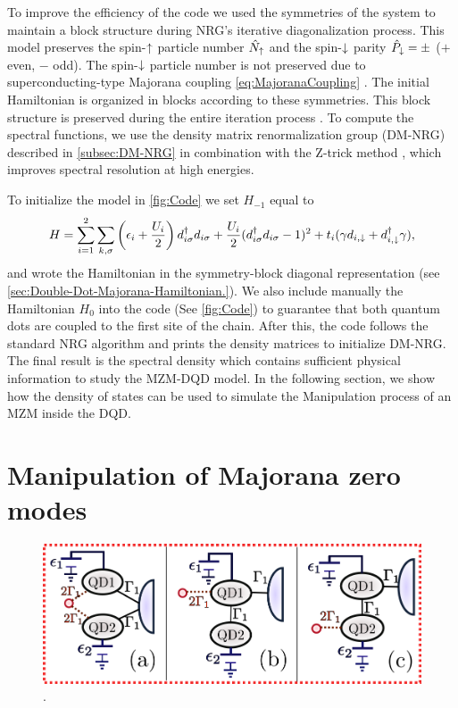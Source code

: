 

To  improve the efficiency of the code we used the symmetries of the system to maintain a block structure during NRG's iterative diagonalization process. This model preserves the spin-$\uparrow$ particle number $\hat{N}_\uparrow$ and the spin-$\downarrow$ parity $\hat{P}_\downarrow = \pm $ ($+$ even, $-$ odd). The spin-$\downarrow$ particle number is not preserved due to superconducting-type Majorana coupling  \eqref{eq:MajoranaCoupling} . The initial Hamiltonian is organized in blocks according to these symmetries. This block structure is preserved during the entire iteration process \cite{bulla_numerical_2008}. To compute the spectral functions, we use the density matrix renormalization group (DM-NRG) described in \ref{subsec:DM-NRG} in combination with the Z-trick method \cite{oliveira_generalized_1994}, which improves spectral resolution at high energies.


To initialize the model in \ref{fig:Code} we set $H_{-1}$ equal to 
\begin{equation}
H =\sum_{i=1}^2\sum_{k,\sigma}\left(\epsilon_{i}+\frac{U_i}{2}\right)d_{i\sigma}^{\dagger}d_{i\sigma}+ \frac{U_i}{2}(d_{i \sigma}^{\dagger}d_{i \sigma}-1)^{2} + t_i(\gamma d_{i,\downarrow}+d^\dagger_{i,\downarrow}\gamma),
\end{equation} 
\noindent and wrote the Hamiltonian in the symmetry-block diagonal representation (see \ref{sec:Double-Dot-Majorana-Hamiltonian.}). We also include manually the Hamiltonian $H_0$ into the code (See \ref{fig:Code}) to guarantee that both quantum dots are coupled to the first site of the chain. After this, the code follows the standard NRG algorithm and prints the density matrices to initialize DM-NRG. The final result is the spectral density which contains sufficient physical information to study the MZM-DQD model. In the following section, we show how the density of states can be used to simulate the Manipulation process of an MZM inside the DQD. 




\section{Manipulation of Majorana zero modes}


\begin{figure}[bt]
\centering
\includegraphics[scale=0.7]{IMAGES/DQD-M/3Model.png}
\caption{\label{fig:MajoranaModels}. \protect\Source{}} 
\end{figure}


